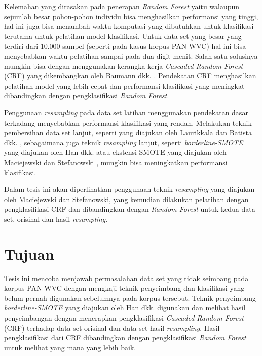 \documentclass[12pt,a4paper,titlepage]{article}
\begin{document}
Kelemahan yang dirasakan pada penerapan \textit{Random Forest} yaitu walaupun sejumlah besar pohon-pohon individu bisa menghasilkan performansi yang tinggi, hal ini juga bisa menambah waktu komputasi yang dibutuhkan untuk klasifikasi terutama untuk pelatihan model klasifikasi.
Untuk data set yang besar yang terdiri dari 10.000 sampel (seperti pada kasus korpus PAN-WVC) hal ini bisa menyebabkan waktu pelatihan sampai pada dua digit menit.
Salah satu solusinya mungkin bisa dengan menggunakan kerangka kerja \textit{Cascaded Random Forest} (CRF) yang dikembangkan oleh Baumann dkk. \cite{baumann2013cascaded}.
Pendekatan CRF menghasilkan pelatihan model yang lebih cepat dan performansi klasifikasi yang meningkat dibandingkan dengan pengklasifikasi \textit{Random Forest}.

Penggunaan \textit{resampling} pada data set latihan menggunakan pendekatan dasar terkadang menyebabkan performansi klasifikasi yang rendah.
Melakukan teknik pembersihan data set lanjut, seperti yang diajukan oleh Laurikkala \cite{laurikkala2001improving} dan Batista dkk. \cite{batista2004study}, sebagaimana juga teknik \textit{resampling} lanjut, seperti \textit{borderline-SMOTE} yang diajukan oleh Han dkk. \cite{han2005borderline} atau ekstensi SMOTE yang diajukan oleh Maciejewski dan Stefanowski \cite{maciejewski2011local}, mungkin bisa meningkatkan performansi klasifikasi.

Dalam tesis ini akan diperlihatkan penggunaan teknik \textit{resampling} yang diajukan oleh Maciejewski dan Stefanowski, yang kemudian dilakukan pelatihan dengan pengklasifikasi CRF dan dibandingkan dengan \textit{Random Forest} untuk kedua data set, orisinal dan hasil \textit{resampling}.


\section{Tujuan}\label{sec:tujuan}

Tesis ini mencoba menjawab permasalahan data set yang tidak seimbang pada korpus PAN-WVC dengan mengkaji teknik penyeimbang dan klasifikasi yang belum pernah digunakan sebelumnya pada korpus tersebut.
Teknik penyeimbang \textit{borderline-SMOTE} yang diajukan oleh Han dkk. \cite{han2005borderline} digunakan dan melihat hasil penyeimbangan dengan menerapkan pengklasifikasi \textit{Cascaded Random Forest} (CRF) terhadap data set orisinal dan data set hasil \textit{resampling}.
Hasil pengklasifikasi dari CRF dibandingkan dengan pengklasifikasi \textit{Random Forest} untuk melihat yang mana yang lebih baik.
\end{document}
